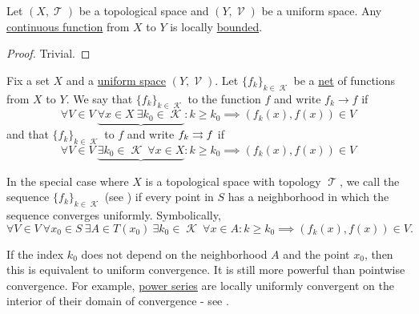 \begin{proposition}\label{thm:continuous_implies_locally_bounded}
  Let \( (X, \mscrT) \) be a topological space and \( (Y, \mscrV) \) be a uniform space. Any \hyperref[thm:uniform_space_local_convergence/topological_source]{continuous function} from \( X \) to \( Y \) is locally \hyperref[def:bounded_function/locally_bounded]{bounded}.
\end{proposition}
\begin{proof}
  Trivial.
\end{proof}

\begin{definition}\label{def:function_net_convergence}
  Fix a set \( X \) and a \hyperref[def:uniform_space]{uniform space} \( (Y, \mscrV) \). Let \( \{ f_k \}_{k \in \mscrK} \) be a \hyperref[def:topological_net]{net} of functions from \( X \) to \( Y \). We say that \( \{ f_k \}_{k \in \mscrK} \)  to the function \( f \) and write \( f_k \to f \) if
  \begin{equation}\label{def:function_net_convergence/pointwise}
    \forall V \in V \ \underbrace{\forall x \in X \ \exists k_0 \in \mscrK} : k \geq k_0 \implies (f_k(x), f(x)) \in V
  \end{equation}
  and that \( \{ f_k \}_{k \in \mscrK} \)  to \( f \) and write \( f_k \rightrightarrows f \) if
  \begin{equation}\label{def:function_net_convergence/uniform}
    \forall V \in V \ \underbrace{\exists k_0 \in \mscrK \ \forall x \in X} : k \geq k_0 \implies (f_k(x), f(x)) \in V
  \end{equation}

  In the special case where \( X \) is a topological space with topology \( \mscrT \), we call the sequence \( \{ f_k \}_{k \in \mscrK} \)  (see \cite{ProofWiki:locally_uniform_convergence}) if every point in \( S \) has a neighborhood in which the sequence converges uniformly. Symbolically,
  \begin{equation}\label{def:function_net_convergence/locally_uniform}
    \forall V \in V \ \forall x_0 \in S \ \exists A \in T(x_0) \ \exists k_0 \in \mscrK \ \forall x \in A : k \geq k_0 \implies (f_k(x), f(x)) \in V.
  \end{equation}

  If the index \( k_0 \) does not depend on the neighborhood \( A \) and the point \( x_0 \), then this is equivalent to uniform convergence. It is still more powerful than pointwise convergence. For example, \hyperref[def:convergent_power_series]{power series} are locally uniformly convergent on the interior of their domain of convergence - see .


\end{definition}
